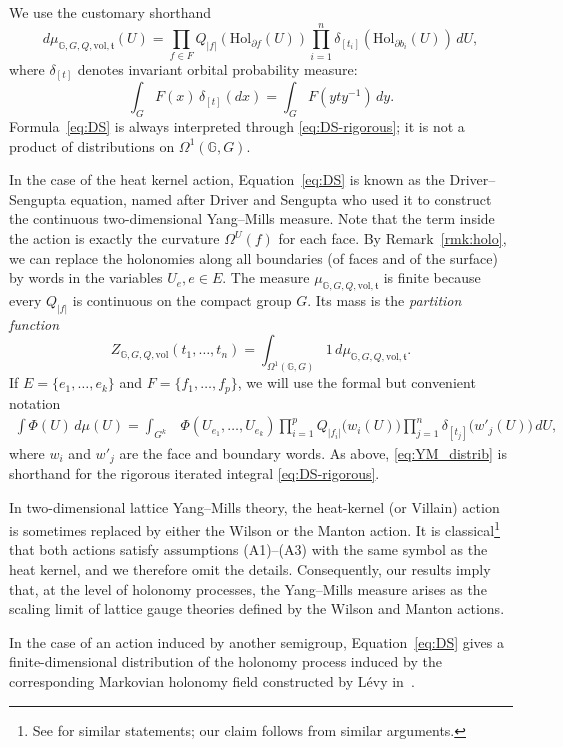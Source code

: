 \documentclass[11pt,a4paper,reqno]{article}
\theoremstyle{definition}
\theoremstyle{remark}
\newcommand\vol{\mathrm{vol}}
\newcommand\Gbb{{\mathbb{G}}}
\newcommand\Hol{{\mathrm{Hol}}}
\begin{document}
We use the customary shorthand
\begin{equation}\label{eq:DS}
 d\mu_{\Gbb,G,Q,\vol,\mathfrak t}(U)
 =
 \prod_{f\in F}Q_{|f|}(\Hol_{\partial f}(U))
 \prod_{i=1}^n\delta_{[t_i]}(\Hol_{\partial b_i}(U))\,dU,
\end{equation}
where $\delta_{[t]}$ denotes invariant orbital probability measure:
\begin{equation}\label{eq:Dirac}
 \int_G F(x)\,\delta_{[t]}(dx)
 =\int_G F(yty^{-1})\,dy.
\end{equation}
Formula~\eqref{eq:DS} is always interpreted through
\eqref{eq:DS-rigorous}; it is not a product of distributions on
$\Omega^1(\Gbb,G)$.

In the case of the heat kernel action, Equation~\eqref{eq:DS} is known as the Driver--Sengupta equation, named after Driver \cite{Dri89} and Sengupta \cite{Sen97} who used it to construct the continuous two-dimensional Yang--Mills measure. Note that the term inside the action is exactly the curvature $\Omega^U(f)$ for each face. By Remark~\ref{rmk:holo}, we can replace the holonomies along all boundaries (of faces and of the surface) by words in the variables $U_e,e\in E$. The measure $\mu_{\Gbb,G,Q,\vol,\mathfrak t}$ is finite because every
$Q_{|f|}$ is continuous on the compact group $G$. Its mass is the
\emph{partition function}
\[
 Z_{\Gbb,G,Q,\vol}(t_1,\ldots,t_n)
 =\int_{\Omega^1(\Gbb,G)}1\,
 d\mu_{\Gbb,G,Q,\vol,\mathfrak t}.
\]
If $E=\{e_1,\ldots,e_k\}$ and $F=\{f_1,\ldots,f_p\}$, we will use the
formal but convenient notation
\begin{equation}\label{eq:YM_distrib}
\begin{aligned}
 \int \Phi(U)\,d\mu(U)
 =\int_{G^k}
 &\Phi(U_{e_1},\ldots,U_{e_k})
 \prod_{i=1}^p Q_{|f_i|}\bigl(w_i(U)\bigr)
 \prod_{j=1}^n\delta_{[t_j]}\bigl(w'_j(U)\bigr)\,dU,
\end{aligned}
\end{equation}
where $w_i$ and $w'_j$ are the face and boundary words. As above,
\eqref{eq:YM_distrib} is shorthand for the rigorous iterated integral
\eqref{eq:DS-rigorous}.
\par In two-dimensional lattice Yang--Mills theory, the heat-kernel (or Villain) action is sometimes replaced by either the Wilson or the Manton action. It is classical\footnote{See \cite{ChevGar25,ChevShen26,DangNohra26} for similar statements; our claim follows from similar arguments.} that both actions satisfy assumptions (A1)--(A3) with the same symbol as the heat kernel, and we therefore omit the details. Consequently, our results imply that, at the level of holonomy processes, the Yang--Mills measure arises as the scaling limit of lattice gauge theories defined by the Wilson and Manton actions.
\par In the case of an action induced by another semigroup, Equation~\eqref{eq:DS} gives a finite-dimensional distribution of the holonomy process induced by the corresponding Markovian holonomy field constructed by L\'evy in~\cite{Lev10}.
\end{document}
